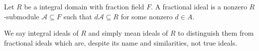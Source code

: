 \begin{defbox}
    \begin{definition}
        Let \(R\) be a integral domain with fraction field \(F\). A fractional ideal is a nonzero \(R\)-submodule \(\mathcal{A} \subseteq F\) such that \(d \mathcal{A} \subseteq R\) for some nonzero \(d \in A\).
    \end{definition}
\end{defbox}

\begin{rembox}
    \begin{remark}
        We say integral ideals of \(R\) and simply mean ideals of \(R\) to distinguish them from fractional ideals which are, despite its name and similarities, not true ideals.
    \end{remark}
\end{rembox}

